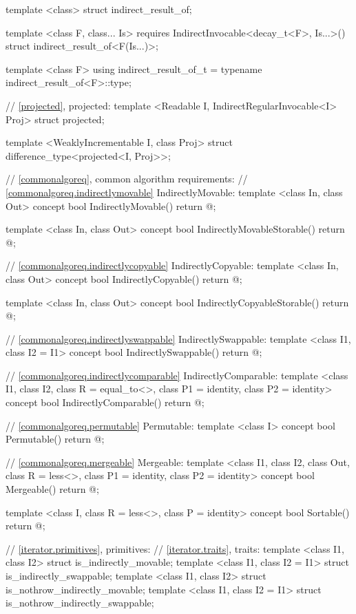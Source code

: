 \begin{codeblock}
{{{{  template <class> struct indirect_result_of;

  template <class F, class... Is>
    requires IndirectInvocable<decay_t<F>, Is...>()
  struct indirect_result_of<F(Is...)>;

  template <class F>
  using indirect_result_of_t
    = typename indirect_result_of<F>::type;

  // \ref{projected}, projected:
  template <Readable I, IndirectRegularInvocable<I> Proj>
  struct projected;

  template <WeaklyIncrementable I, class Proj>
  struct difference_type<projected<I, Proj>>;

  // \ref{commonalgoreq}, common algorithm requirements:
  // \ref{commonalgoreq.indirectlymovable} IndirectlyMovable:
  template <class In, class Out>
  concept bool IndirectlyMovable() {
    return @\seebelow@;
  }

  template <class In, class Out>
  concept bool IndirectlyMovableStorable() {
    return @\seebelow@;
  }

  // \ref{commonalgoreq.indirectlycopyable} IndirectlyCopyable:
  template <class In, class Out>
  concept bool IndirectlyCopyable() {
    return @\seebelow@;
  }

  template <class In, class Out>
  concept bool IndirectlyCopyableStorable() {
    return @\seebelow@;
  }

  // \ref{commonalgoreq.indirectlyswappable} IndirectlySwappable:
  template <class I1, class I2 = I1>
  concept bool IndirectlySwappable() {
    return @\seebelow@;
  }

  // \ref{commonalgoreq.indirectlycomparable} IndirectlyComparable:
  template <class I1, class I2, class R = equal_to<>, class P1 = identity,
      class P2 = identity>
  concept bool IndirectlyComparable() {
    return @\seebelow@;
  }

  // \ref{commonalgoreq.permutable} Permutable:
  template <class I>
  concept bool Permutable() {
    return @\seebelow@;
  }

  // \ref{commonalgoreq.mergeable} Mergeable:
  template <class I1, class I2, class Out,
      class R = less<>, class P1 = identity, class P2 = identity>
  concept bool Mergeable() {
    return @\seebelow@;
  }

  template <class I, class R = less<>, class P = identity>
  concept bool Sortable() {
    return @\seebelow@;
  }

  // \ref{iterator.primitives}, primitives:
  // \ref{iterator.traits}, traits:
  template <class I1, class I2> struct is_indirectly_movable;
  template <class I1, class I2 = I1> struct is_indirectly_swappable;
  template <class I1, class I2> struct is_nothrow_indirectly_movable;
  template <class I1, class I2 = I1> struct is_nothrow_indirectly_swappable;

}}}}
\end{codeblock}
